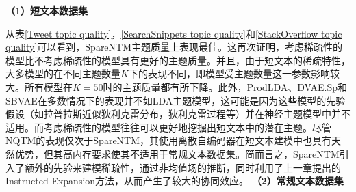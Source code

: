 \begin{table}
    \centering
    \caption{StackOverflow数据集在不同模型下的主题质量}
    \label{StackOverflow topic quality}
    \footnotesize
\end{table}

\textbf{（1）短文本数据集} 

从表\ref{Tweet topic quality}，\ref{SearchSnippets topic quality}和\ref{StackOverflow topic quality}可以看到，SpareNTM主题质量上表现最佳。这再次证明，考虑稀疏性的模型比不考虑稀疏性的模型具有更好的主题质量。并且，由于短文本的稀疏特性，大多模型的在不同主题数量$K$下的表现不同，即模型受主题数量这一参数影响较大。所有模型在$K=50$时的主题质量都有所下降。此外，ProdLDA、DVAE.Sp和SBVAE在多数情况下的表现并不如LDA主题模型，这可能是因为这些模型的先验假设（如拉普拉斯近似狄利克雷分布，狄利克雷过程等）并在神经主题模型中并不适用。而考虑稀疏性的模型往往可以更好地挖掘出短文本中的潜在主题。尽管NQTM的表现仅次于SpareNTM，其使用离散自编码器在短文本建模中也具有天然优势，但其高内存要求使其不适用于常规文本数据集。简而言之，SpareNTM引入了额外的先验来建模稀疏性，通过非均值场的推断，同时利用了上一章提出的Instructed-Expansion方法，从而产生了较大的协同效应。
\newpage
\textbf{（2）常规文本数据集} 

